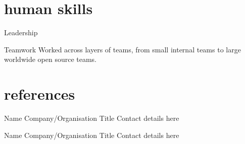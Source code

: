 \documentclass[]{friggeri-cv} %
\begin{document}
\section{human skills}

\begin{entrylist}




\entry
{}
{Leadership}
{}
{}
{

}



\entry
{}
{Teamwork}
{}
{}
{
Worked across layers of teams, from small internal teams to large worldwide open source teams.
}




\end{entrylist}



\section{references}


\begin{entrylist}


\entry
{}
{Name}
{Company/Organisation}
{Title}
{
Contact details here
}


\entry
{}
{Name}
{Company/Organisation}
{Title}
{
Contact details here
}

\end{entrylist} 

\end{document}
